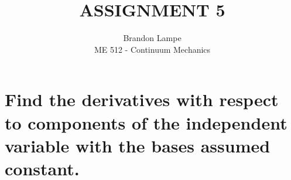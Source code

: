 \documentclass[10pt, letterpaper]{article}
\begin{document}
 
 
\title{ASSIGNMENT 5}%
\author{Brandon Lampe\\ %
ME 512 - Continuum Mechanics} %
 
\maketitle

\section{Find the derivatives with respect to components of the independent variable with the bases assumed constant.}
\end{document}
